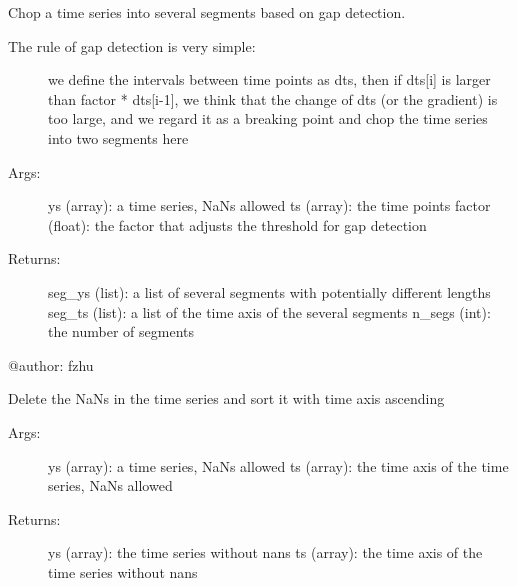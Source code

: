 \documentclass[letterpaper,10pt,english]{sphinxmanual}
\begin{document}
\begin{fulllineitems}
\label{\detokenize{Timeseries:pyleoclim.Timeseries.ts2segments}}
Chop a time series into several segments based on gap detection.
\begin{description}
\item[{The rule of gap detection is very simple:}] \leavevmode
we define the intervals between time points as dts, then if dts{[}i{]} is larger than factor * dts{[}i-1{]},
we think that the change of dts (or the gradient) is too large, and we regard it as a breaking point
and chop the time series into two segments here

\item[{Args:}] \leavevmode
ys (array): a time series, NaNs allowed
ts (array): the time points
factor (float): the factor that adjusts the threshold for gap detection

\item[{Returns:}] \leavevmode
seg\_ys (list): a list of several segments with potentially different lengths
seg\_ts (list): a list of the time axis of the several segments
n\_segs (int): the number of segments

\end{description}

@author: fzhu

\end{fulllineitems}


\begin{fulllineitems}
\label{\detokenize{Timeseries:pyleoclim.Timeseries.clean_ts}}
Delete the NaNs in the time series and sort it with time axis ascending
\begin{description}
\item[{Args:}] \leavevmode
ys (array): a time series, NaNs allowed
ts (array): the time axis of the time series, NaNs allowed

\item[{Returns:}] \leavevmode
ys (array): the time series without nans
ts (array): the time axis of the time series without nans

\end{description}

\end{fulllineitems}
\end{document}
